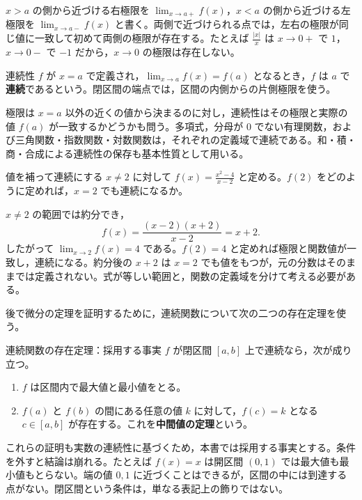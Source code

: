 $x>a$ の側から近づける右極限を $\lim_{x\to a+}f(x)$，$x<a$ の側から近づける左極限を $\lim_{x\to a-}f(x)$ と書く。両側で近づけられる点では，左右の極限が同じ値に一致して初めて両側の極限が存在する。たとえば $\frac{|x|}{x}$ は $x\to0+$ で $1$，$x\to0-$ で $-1$ だから，$x\to0$ の極限は存在しない。

\begin{definition}{連続性}
$f$ が $x=a$ で定義され，$\lim_{x\to a}f(x)=f(a)$ となるとき，$f$ は $a$ で\textbf{連続}であるという。閉区間の端点では，区間の内側からの片側極限を使う。
\end{definition}

極限は $x=a$ 以外の近くの値から決まるのに対し，連続性はその極限と実際の値 $f(a)$ が一致するかどうかも問う。多項式，分母が $0$ でない有理関数，および三角関数・指数関数・対数関数は，それぞれの定義域で連続である。和・積・商・合成による連続性の保存も基本性質として用いる。

\begin{example}{値を補って連続にする}
$x\ne2$ に対して $f(x)=\frac{x^2-4}{x-2}$ と定める。$f(2)$ をどのように定めれば，$x=2$ でも連続になるか。
\end{example}
$x\ne2$ の範囲では約分でき，
\[
 f(x)=\frac{(x-2)(x+2)}{x-2}=x+2.
\]
したがって $\lim_{x\to2}f(x)=4$ である。$f(2)=4$ と定めれば極限と関数値が一致し，連続になる。約分後の $x+2$ は $x=2$ でも値をもつが，元の分数はそのままでは定義されない。式が等しい範囲と，関数の定義域を分けて考える必要がある。

後で微分の定理を証明するために，連続関数について次の二つの存在定理を使う。

\begin{theorem}{連続関数の存在定理：採用する事実}\label{定理:連続関数存在}
$f$ が閉区間 $[a,b]$ 上で連続なら，次が成り立つ。
\begin{enumerate}[label=(\arabic*),leftmargin=*]
 \item $f$ は区間内で最大値と最小値をとる。
 \item $f(a)$ と $f(b)$ の間にある任意の値 $k$ に対して，$f(c)=k$ となる $c\in[a,b]$ が存在する。これを\textbf{中間値の定理}という。
\end{enumerate}
\end{theorem}

これらの証明も実数の連続性に基づくため，本書では採用する事実とする。条件を外すと結論は崩れる。たとえば $f(x)=x$ は開区間 $(0,1)$ では最大値も最小値もとらない。端の値 $0,1$ に近づくことはできるが，区間の中には到達する点がない。閉区間という条件は，単なる表記上の飾りではない。

